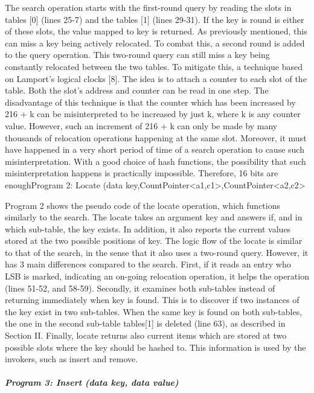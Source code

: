 \documentclass{article}
\begin{document}
\bigskip

The search operation starts with the first-round query by reading the slots in tables [0] (lines 25-7) and the tables
[1] (lines 29-31). If the key is round is either of these slots, the value mapped to key is returned. As previously
mentioned, this can miss a key being actively relocated. To combat this, a second round is added to the query
operation. This two-round query can still miss a key being constantly relocated between the two tables. To mitigate
this, a technique based on Lamport's logical clocks [8]. The idea is to attach a counter to each slot of the table.
Both the slot's address and counter can be read in one step. The disadvantage of this technique is that the counter
which has been increased by 216 + k can be misinterpreted to be increased by just k, where k is any counter value.
However, such an increment of 216 + k can only be made by many thousands of relocation operations happening at the same
slot. Moreover, it must have happened in a very short period of time of a search operation to cause such
misinterpretation. With a good choice of hash functions, the possibility that such misinterpretation happens is
practically impossible. Therefore, 16 bits are enoughProgram 2: Locate (data
key,CountPointer{\textless}a1,c1{\textgreater},CountPointer{\textless}a2,c2{\textgreater}

Program 2 shows the pseudo code of the locate operation, which functions similarly to the search. The locate takes an
argument key and answers if, and in which sub-table, the key exists. In addition, it also reports the current values
stored at the two possible positions of key. The logic flow of the locate is similar to that of the search, in the
sense that it also uses a two-round query. However, it has 3 main differences compared to the search. First, if it
reads an entry who LSB is marked, indicating an on-going relocation operation, it helps the operation (lines 51-52, and
58-59). Secondly, it examines both sub-tables instead of returning immediately when key is found. This is to discover
if two instances of the key exist in two sub-tables. When the same key is found on both sub-tables, the one in the
second sub-table tables[1] is deleted (line 63), as described in Section II. Finally, locate returns also current items
which are stored at two possible slots where the key should be hashed to. This information is used by the invokers,
such as insert and remove.

\subparagraph{Program 3: Insert (data key, data value)}
\end{document}

